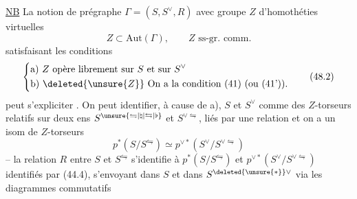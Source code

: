 \uline{NB} La notion de prégraphe $\Gamma=(S,S^\vee,R)$ avec groupe $Z$ d'homothéties virtuelles
\[
 Z\subset\mathrm{Aut}(\Gamma),\qquad Z\text{ ss-gr. comm.} \tag*{(48.1)}
\]
satisfaisant les conditions
\[
 \left\{\begin{aligned}
 &\text{a) }Z\text{ opère librement sur }S\text{ et sur }S^\vee\\
 &\text{b) }\deleted{\unsure{Z}}\ \text{On a la condition (41) (ou (41')).}
 \end{aligned}\right.\tag*{(48.2)}
\]
peut s'expliciter  . On peut identifier, à cause
de a),  $S$ et $S^\vee$ comme des $Z$-torseurs relatifs
sur deux ens $S^{\unsure{\leftrightharpoons|\natural|\leftrightarrows|\flat}}$ et $S^{\vee\leftrightharpoons}$, liés par une relation
et on a un isom de $Z$-torseurs
\[
 p^*(S/S^\leftrightharpoons)\simeq p^{\vee *}(S^\vee/S^{\vee\leftrightharpoons})
 \tag*{(48.4)}
\]
-- la relation $R$ entre $S$ et $S^\leftrightharpoons$ s'identifie à
$p^*(S/S^\leftrightharpoons)$ et $p^{\vee *}(S^\vee/S^{\vee\leftrightharpoons})$ identifiés par (44.4), s'envoyant
dans $S$ et dans $S^{\deleted{\unsure{*}}\vee}$ via les diagrammes commutatifs

